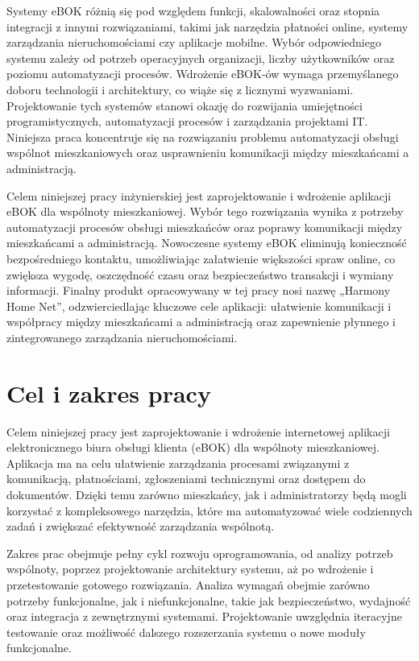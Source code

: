 Systemy eBOK różnią się pod względem funkcji, skalowalności oraz stopnia integracji z innymi rozwiązaniami, takimi jak narzędzia płatności online, systemy zarządzania nieruchomościami czy aplikacje mobilne. Wybór odpowiedniego systemu zależy od potrzeb operacyjnych organizacji, liczby użytkowników oraz poziomu automatyzacji procesów. Wdrożenie eBOK-ów wymaga przemyślanego doboru technologii i architektury, co wiąże się z licznymi wyzwaniami. Projektowanie tych systemów stanowi okazję do rozwijania umiejętności programistycznych, automatyzacji procesów i zarządzania projektami IT. Niniejsza praca koncentruje się na rozwiązaniu problemu automatyzacji obsługi wspólnot mieszkaniowych oraz usprawnieniu komunikacji między mieszkańcami a administracją.

Celem niniejszej pracy inżynierskiej jest zaprojektowanie i wdrożenie aplikacji eBOK dla wspólnoty mieszkaniowej. Wybór tego rozwiązania wynika z potrzeby automatyzacji procesów obsługi mieszkańców oraz poprawy komunikacji między mieszkańcami a administracją. Nowoczesne systemy eBOK eliminują konieczność bezpośredniego kontaktu, umożliwiając załatwienie większości spraw online, co zwiększa wygodę, oszczędność czasu oraz bezpieczeństwo transakcji i wymiany informacji. 
Finalny produkt opracowywany w tej pracy nosi nazwę „Harmony Home Net”, odzwierciedlając kluczowe cele aplikacji: ułatwienie komunikacji i współpracy między mieszkańcami a administracją oraz zapewnienie płynnego i zintegrowanego zarządzania nieruchomościami.

\section{Cel i zakres pracy}

Celem niniejszej pracy jest zaprojektowanie i wdrożenie internetowej aplikacji elektronicznego biura obsługi klienta (eBOK) dla wspólnoty mieszkaniowej. Aplikacja ma na celu ułatwienie zarządzania procesami związanymi z komunikacją, płatnościami, zgłoszeniami technicznymi oraz dostępem do dokumentów. Dzięki temu zarówno mieszkańcy, jak i administratorzy będą mogli korzystać z kompleksowego narzędzia, które ma automatyzować wiele codziennych zadań i zwiększać efektywność zarządzania wspólnotą.

Zakres prac obejmuje pełny cykl rozwoju oprogramowania, od analizy potrzeb wspólnoty, poprzez projektowanie architektury systemu, aż po wdrożenie i przetestowanie gotowego rozwiązania. Analiza wymagań obejmie zarówno potrzeby funkcjonalne, jak i niefunkcjonalne, takie jak bezpieczeństwo, wydajność oraz integracja z zewnętrznymi systemami. Projektowanie uwzględnia iteracyjne testowanie oraz możliwość dalszego rozszerzania systemu o nowe moduły funkcjonalne.

